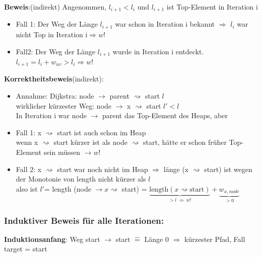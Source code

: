         \textbf{Beweis}:(indirekt) Angenommen, $l_{i+1} < l_i$ und $l_{i+1}$ ist Top-Element in Iteration i
        \begin{itemize}
            \item Fall 1: Der Weg der Länge $l_{i+1}$ war schon in Iteration i bekannt $\Rightarrow$ $l_i$ war nicht Top in Iteration i$\Rightarrow w!$
            \item Fall2: Der Weg der Länge $l_{i+1}$ wurde in Iteration i entdeckt. $l_{i+1} = l_i + w_{uv} > l_i \Rightarrow w!$\\
        \end{itemize}

        \textbf{Korrektheitsbeweis}(indirekt):
        \begin{itemize}
            \item Annahme: Dijkstra: node $\rightarrow$ parent $\rightsquigarrow$ start \hspace*{1.2cm} $l$\\
            wirklicher kürzester Weg: node $\rightarrow$ x $\rightsquigarrow$ start \hspace*{1cm} $l' < l$\\
            In Iteration i war node $\rightarrow$ parent das Top-Element des Heaps, aber
            \item Fall 1: x $\rightsquigarrow$ start ist auch schon im Heap \\
            wenn x $\rightsquigarrow$ start kürzer ist als node $\rightsquigarrow$ start, hätte er schon früher Top-Element sein müssen $\rightarrow w!$
            \item Fall 2: x $\rightsquigarrow$ start war noch nicht im Heap $\Rightarrow$ länge (x $\rightsquigarrow$ start) ist wegen der Monotonie von length nicht kürzer als $l$\\
            also ist $l'$= length (node $\rightarrow x \rightsquigarrow$ start) = $\underbrace{\text{length}(x \rightsquigarrow \text{start})}_{> l \  \Rightarrow \ w!} + \underbrace{w_{x, node}}_{>0}$
        \end{itemize}

        \subsubsection*{Induktiver Beweis für alle Iterationen:}
        \textbf{Induktionsanfang}: Weg start $\rightarrow$ start $\widehat{=}$ Länge 0 $\Rightarrow$ kürzester Pfad, Fall target = start\\

